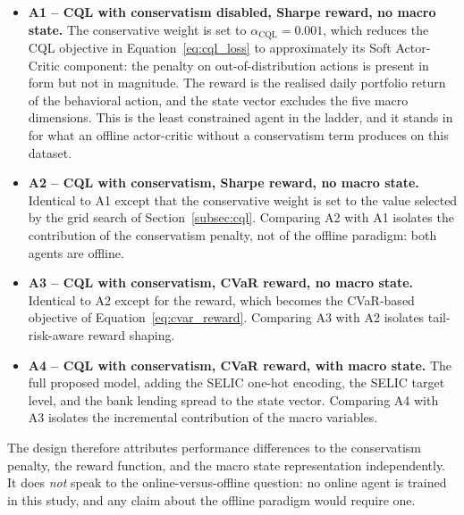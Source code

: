\begin{itemize}
  \item \textbf{A1 -- CQL with conservatism disabled, Sharpe reward, no macro
        state.}
        The conservative weight is set to $\alpha_{\text{CQL}} = 0.001$, which
        reduces the CQL objective in Equation~\eqref{eq:cql_loss} to
        approximately its Soft Actor-Critic component: the penalty on
        out-of-distribution actions is present in form but not in magnitude.
        The reward is the realised daily portfolio return of the behavioral
        action, and the state vector excludes the five macro dimensions.
        This is the least constrained agent in the ladder, and it stands in for
        what an offline actor-critic without a conservatism term produces on
        this dataset.

  \item \textbf{A2 -- CQL with conservatism, Sharpe reward, no macro state.}
        Identical to A1 except that the conservative weight is set to the value
        selected by the grid search of Section~\ref{subsec:cql}.
        Comparing A2 with A1 isolates the contribution of the conservatism
        penalty, not of the offline paradigm: both agents are offline.

  \item \textbf{A3 -- CQL with conservatism, CVaR reward, no macro state.}
        Identical to A2 except for the reward, which becomes the CVaR-based
        objective of Equation~\eqref{eq:cvar_reward}.
        Comparing A3 with A2 isolates tail-risk-aware reward shaping.

  \item \textbf{A4 -- CQL with conservatism, CVaR reward, with macro state.}
        The full proposed model, adding the SELIC one-hot encoding, the SELIC
        target level, and the bank lending spread to the state vector.
        Comparing A4 with A3 isolates the incremental contribution of the macro
        variables.
\end{itemize}

The design therefore attributes performance differences to the conservatism
penalty, the reward function, and the macro state representation independently.
It does \emph{not} speak to the online-versus-offline question: no online agent
is trained in this study, and any claim about the offline paradigm would require
one.
